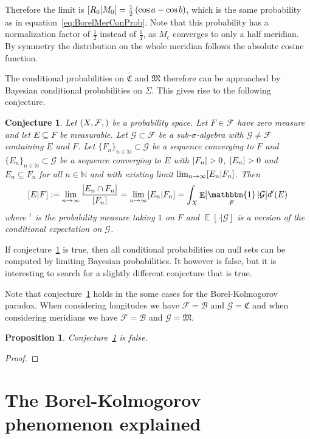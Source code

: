 \documentclass[twoside,a4paper]{report}
\theoremstyle{plain}
\newtheorem{proposition}[theorem]{Proposition}
\newtheorem{conjecture}[theorem]{Conjecture}
\theoremstyle{definition}
\theoremstyle{remark}
\numberwithin{equation}{chapter}
\newcommand{\N}{\mathbb{N}}
\let\P\relax
\DeclareMathOperator{\P}{\mathbb{P}}
\DeclareMathOperator{\E}{\mathbb{E}}
\DeclareMathOperator{\1}{\mathbbm{1}}
\newcommand{\F}{\mathcal{F}}
\renewcommand{\G}{\mathcal{G}}
\newcommand{\B}{\mathcal{B}}
\begin{document}
Therefore the limit is $\P[R_0|M_0]=\frac{1}{2}\left(\cos a-\cos b\right)$, which is the same probability as in equation~\ref{eq:BorelMerConProb}. Note that this probability has a normalization factor of $\frac{1}{2}$ instead of $\frac{1}{4}$, as $M_\epsilon$ converges to only a half meridian. By symmetry the distribution on the whole meridian follows the absolute cosine function.

The conditional probabilities on $\mathfrak{C}$ and $\mathfrak{M}$ therefore can be approached by Bayesian conditional probabilities on $\Sigma$. This gives rise to the following conjecture.
\begin{conjecture}\label{con:BorelConjecture}
Let $(X,\F,\P)$ be a probability space. Let $F\in\mathcal{F}$ have zero measure and let $E\subseteq F$ be measurable. Let $\G\subset\F$ be a sub-$\sigma$-algebra with $\G\neq\F$ containing $E$ and $F$. Let $\{F_n\}_{n\in\N}\subset\G$ be a sequence converging to $F$ and $\{E_n\}_{n\in\N}\subset\G$ be a sequence converging to $E$ with $\P[F_n]>0$, $\P[E_n]>0$ and $E_n\subseteq F_n$ for all $n\in\N$ and with existing limit $\lim_{n\to\infty}\P[E_n|F_n]$. Then
\[\P[E|F]:=\lim_{n\to\infty}\frac{\P[E_n\cap F_n]}{\P[F_n]}=\lim_{n\to\infty}\P[E_n|F_n]=\int_X\E[\1_F|\mathcal{G}]d\P'(E)\] where $\P'$ is the probability measure taking $1$ on $F$ and $\E[\cdot|\G]$ is a version of the conditional expectation on $\G$.
\end{conjecture}

If conjecture~\ref{con:BorelConjecture} is true, then all conditional probabilities on null sets can be computed by limiting Bayesian probabilities. It however is false, but it is interesting to search for a slightly different conjecture that is true.

Note that conjecture~\ref{con:BorelConjecture} holds in the some cases for the Borel-Kolmogorov paradox. When considering longitudes we have $\F=\B$ and $\G=\mathfrak{C}$ and when considering meridians we have $\F=\B$ and $\G=\mathfrak{M}$.

\begin{proposition}
Conjecture~\ref{con:BorelConjecture} is false.
\end{proposition}
\begin{proof}

\end{proof}

\section{The Borel-Kolmogorov phenomenon explained}
\end{document}
